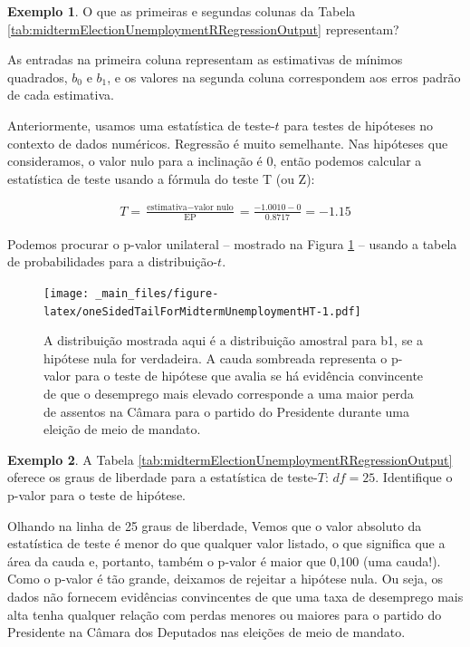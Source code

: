 \documentclass[
]{book}
\theoremstyle{definition}
\theoremstyle{definition}
\newtheorem{example}{Exemplo}[chapter]
\theoremstyle{definition}
\theoremstyle{definition}
\theoremstyle{remark}
\begin{document}
\begin{example}
\protect\hypertarget{exm:unnamed-chunk-282}{}{\label{exm:unnamed-chunk-282} }O que as primeiras e segundas colunas da Tabela \ref{tab:midtermElectionUnemploymentRRegressionOutput} representam?
\end{example}

As entradas na primeira coluna representam as estimativas de mínimos quadrados, \(b_0\) e \(b_1\), e os valores na segunda coluna correspondem aos erros padrão de cada estimativa.

Anteriormente, usamos uma estatística de teste-\(t\) para testes de hipóteses no contexto de dados numéricos. Regressão é muito semelhante. Nas hipóteses que consideramos, o valor nulo para a inclinação é 0, então podemos calcular a estatística de teste usando a fórmula do teste T (ou Z):

\begin{align*}
T = \frac{\text{estimativa} - \text{valor nulo}}{\text{EP}} = \frac{-1.0010 - 0}{0.8717} = -1.15
\end{align*}

Podemos procurar o p-valor unilateral -- mostrado na Figura \ref{fig:oneSidedTailForMidtermUnemploymentHT} -- usando a tabela de probabilidades para a distribuição-\(t\).

\begin{figure}
\centering
\texttt{[image: \_main\_files/figure-latex/oneSidedTailForMidtermUnemploymentHT-1.pdf]}
\caption{\label{fig:oneSidedTailForMidtermUnemploymentHT}A distribuição mostrada aqui é a distribuição amostral para b1, se a hipótese nula for verdadeira. A cauda sombreada representa o p-valor para o teste de hipótese que avalia se há evidência convincente de que o desemprego mais elevado corresponde a uma maior perda de assentos na Câmara para o partido do Presidente durante uma eleição de meio de mandato.}
\end{figure}

\begin{example}
\protect\hypertarget{exm:unnamed-chunk-283}{}{\label{exm:unnamed-chunk-283} }A Tabela \ref{tab:midtermElectionUnemploymentRRegressionOutput} oferece os graus de liberdade para a estatística de teste-\(T\): \(df = 25\). Identifique o p-valor para o teste de hipótese.
\end{example}

Olhando na linha de 25 graus de liberdade, Vemos que o valor absoluto da estatística de teste é menor do que qualquer valor listado, o que significa que a área da cauda e, portanto, também o p-valor é maior que 0,100 (uma cauda!). Como o p-valor é tão grande, deixamos de rejeitar a hipótese nula. Ou seja, os dados não fornecem evidências convincentes de que uma taxa de desemprego mais alta tenha qualquer relação com perdas menores ou maiores para o partido do Presidente na Câmara dos Deputados nas eleições de meio de mandato.
\end{document}
